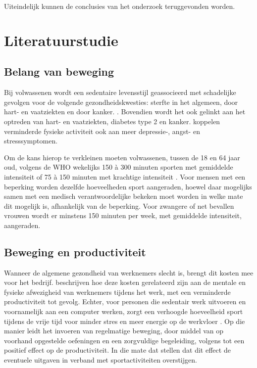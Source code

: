 Uiteindelijk kunnen de conclusies van het onderzoek teruggevonden worden.



\section{Literatuurstudie}%
\label{sec:state-of-the-art}

\subsection{Belang van beweging}

Bij volwassenen wordt een sedentaire levensstijl geassocieerd met schadelijke gevolgen voor de volgende gezondheidskwesties: sterfte in het algemeen, door hart- en vaatziekten en door kanker. \autocite{Bull2020}. Bovendien wordt het ook gelinkt aan het optreden van hart- en vaatziekten, diabetes type 2 en kanker. \textcite{Stanton2020} koppelen verminderde fysieke activiteit ook aan meer depressie-, angst- en stresssymptomen.

Om de kans hierop te verkleinen moeten volwassenen, tussen de 18 en 64 jaar oud, volgens de WHO wekelijks 150 à 300 minuten sporten met gemiddelde intensiteit of 75 à 150 minuten met krachtige intensiteit \autocite{Bull2020}. Voor mensen met een beperking worden dezelfde hoeveelheden sport aangeraden, hoewel daar mogelijks samen met een medisch verantwoordelijke bekeken moet worden in welke mate dit mogelijk is, afhankelijk van de beperking. Voor zwangere of net bevallen vrouwen wordt er minstens 150 minuten per week, met gemiddelde intensiteit, aangeraden.

\subsection{Beweging en productiviteit}

Wanneer de algemene gezondheid van werknemers slecht is, brengt dit kosten mee voor het bedrijf. \textcite{Sjoegaard2016} beschrijven hoe deze kosten gerelateerd zijn aan de mentale en fysieke afwezigheid van werknemers tijdens het werk, met een verminderde productiviteit tot gevolg. Echter, voor personen die sedentair werk uitvoeren en voornamelijk aan een computer werken, zorgt een verhoogde hoeveelheid sport tijdens de vrije tijd voor minder stres en meer energie op de werkvloer \autocite{Hansen2009}. Op die manier leidt het invoeren van regelmatige beweging, door middel van op voorhand opgestelde oefeningen en een zorgvuldige begeleiding, volgens \textcite{Cancelliere2011} tot een positief effect op de productiviteit. In die mate dat \textcite{Sjoegaard2016} stellen dat dit effect de eventuele uitgaven in verband met sportactiviteiten overstijgen.

